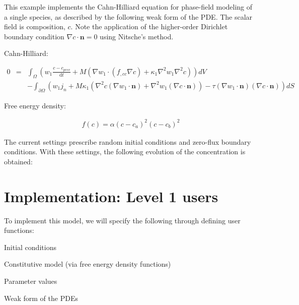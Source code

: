 

This example implements the Cahn-\/\-Hilliard equation for phase-\/field modeling of a single species, as described by the following weak form of the P\-D\-E. The scalar field is composition, $c$. Note the application of the higher-\/order Dirichlet boundary condition $\nabla c\cdot\boldsymbol{n}=0$ using Nitsche's method.

Cahn-\/\-Hilliard\-:

\begin{eqnarray*} 0 &=& \int_\Omega \left(w_1\frac{c - c_{prev}}{\mathrm{d}t} + M\left(\nabla w_1\cdot(f_{,cc}\nabla c) + \kappa_1\nabla^2 w_1\nabla^2 c\right)\right) dV\\ &\phantom{=}& - \int_{\partial\Omega} \left(w_1j_n + M\kappa_1\left(\nabla^2c(\nabla w_1\cdot\boldsymbol{n}) + \nabla^2w_1(\nabla c\cdot\boldsymbol{n})\right) - \tau(\nabla w_1\cdot\boldsymbol{n})(\nabla c\cdot\boldsymbol{n})\right) dS \end{eqnarray*}

Free energy density\-:

\begin{eqnarray*} f(c) = \alpha(c - c_a)^2(c - c_b)^2 \end{eqnarray*}

The current settings prescribe random initial conditions and zero-\/flux boundary conditions. With these settings, the following evolution of the concentration is obtained\-:

 

\section*{Implementation\-: Level 1 users }

To implement this model, we will specify the following through defining user functions\-: \par

\begin{DoxyItemize}
\item Initial conditions \par

\item Constitutive model (via free energy density functions) \par

\item Parameter values \par

\item Weak form of the P\-D\-Es \par

\end{DoxyItemize}

